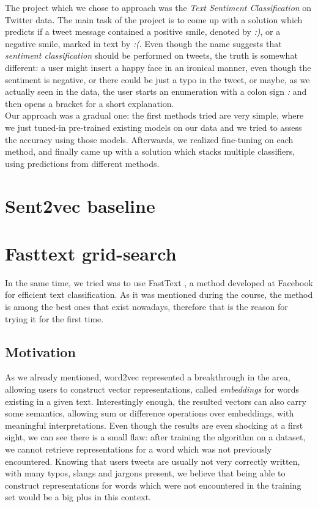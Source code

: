 \documentclass[10pt,conference,compsocconf]{IEEEtran}
\begin{document}
The project which we chose to approach was the \textit{Text Sentiment Classification} on Twitter data. The main task of the project is to come up with a solution which predicts if a tweet message contained a positive smile, denoted by \textit{:)}, or a negative smile, marked in text by \textit{:(}. Even though the name suggests that \textit{sentiment classification} should be performed on tweets, the truth is somewhat different: a user might insert a happy face in an ironical manner, even though the sentiment is negative, or there could be just a typo in the tweet, or maybe, as we actually seen in the data, the user starts an enumeration with a colon sign \textit{:} and then opens a bracket for a short explanation. \\

Our approach was a gradual one: the first methods tried are very simple, where we just tuned-in pre-trained existing models on our data and we tried to assess the accuracy using those models. Afterwards, we realized fine-tuning on each method, and finally came up with a solution which stacks multiple classifiers, using predictions from different methods. 

\section{Sent2vec baseline}

\section{Fasttext grid-search}
In the same time, we tried was to use FastText \cite{JGB16+}, a method developed at Facebook for efficient text classification. As it was mentioned during the course, the method is among the best ones that exist nowadays, therefore that is the reason for trying it for the first time. 

\subsection{Motivation}
As we already mentioned, word2vec represented a breakthrough in the area, allowing  users to construct vector representations, called \textit{embeddings} for words existing in a given text. Interestingly enough, the resulted vectors can also carry some semantics, allowing sum or difference operations over embeddings, with meaningful interpretations. Even though the results are even shocking at a first sight, we can see there is a small flaw: after training the algorithm on a dataset, we cannot retrieve representations for a word which was not previously encountered. Knowing that users tweets are usually not very correctly written, with many typos, slangs and jargons present, we believe that being able to construct representations for words which were not encountered in the training set would be a big plus in this context.\\
\end{document}

